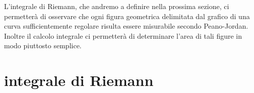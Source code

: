 \begin{comment}
\section{area di un poligono}

Il teorema~\ref{th:area_lineare} ci dice che se applichiamo ad un insieme 
$E$ una trasformazione lineare affine $L$ la cui matrice associata ha determinante 
$1$ o $-1$, otteniamo un insieme $L(E)$ con la stessa misura.
In particolare la misura di un insieme è invariante per isometrie:
cioè per quelle trasformazioni la cui matrice associata è ortogonale 
(traslazioni, rotazioni, riflessioni).

Se $E$ è un triangolo rettangolo con cateti di lunghezza $a$ e $b$ 
a meno di rotazioni e traslazioni possiamo supporre che $E$ si ottenga 
dividendo il rettangolo $[0,a]\times[0,b]$ lungo una diagonale. 
Visto che le due parti in cui il rettangolo viene suddiviso sono tra 
loro isometriche, esse devono avere ...

*** mi serve dimostrare che i poligoni sono misurabili ***
\end{comment}

L'integrale di Riemann, che andremo a definire
nella prossima sezione, ci permetterà di osservare che ogni figura geometrica
delimitata dal grafico di una curva sufficientemente regolare risulta
essere misurabile secondo Peano-Jordan. 
Inoltre il calcolo integrale ci permetterà
di determinare l'area di tali figure in modo piuttosto semplice.

\section{integrale di Riemann}

